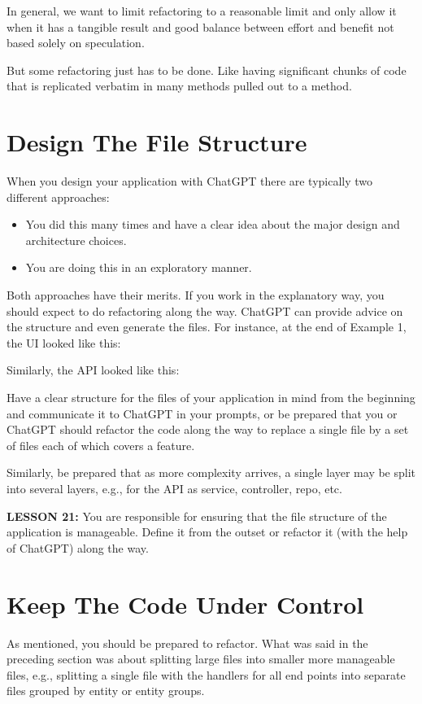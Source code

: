 \documentclass[runningheads]{llncs}
\begin{document}
In general, we want to limit refactoring to a reasonable limit and only allow it when it has a tangible result and good balance between effort and benefit not based solely on speculation.

But some refactoring just has to be done. Like having significant chunks of code that is replicated verbatim in many methods pulled out to a method.

\section{Design The File Structure}
When you design your application with ChatGPT there are typically two different approaches:
\begin{itemize}
    \item You did this many times and have a clear idea about the major design and architecture choices.
    \item You are doing this in an exploratory manner.
\end{itemize}

Both approaches have their merits. If you work in the explanatory way, you should expect to do refactoring along the way. ChatGPT can provide advice on the structure and even generate the files. For instance, at the end of Example 1, the UI looked like this:

Similarly, the API looked like this:

Have a clear structure for the files of your application in mind from the beginning and communicate it to ChatGPT in your prompts, or be prepared that you or ChatGPT should refactor the code along the way to replace a single file by a set of files each of which covers a feature.

Similarly, be prepared that as more complexity arrives, a single layer may be split into several layers, e.g., for the API as service, controller, repo, etc.

\textbf{LESSON 21:} You are responsible for ensuring that the file structure of the application is manageable. Define it from the outset or refactor it (with the help of ChatGPT) along the way.

\section{Keep The Code Under Control}
As mentioned, you should be prepared to refactor. What was said in the preceding section was about splitting large files into smaller more manageable files, e.g., 
splitting a single file with the handlers for all end points into separate files grouped by entity or entity groups.
\end{document}
